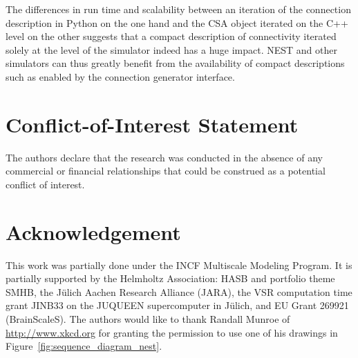 \documentclass{frontiersSCNS} %
\begin{document}
The differences in run time and scalability between an iteration of
the connection description in Python on the one hand and the CSA
object iterated on the C++ level on the other suggests that a compact
description of connectivity iterated solely at the level of the
simulator indeed has a huge impact. NEST and other simulators can thus
greatly benefit from the availability of compact descriptions such as
enabled by the connection generator interface.


\section*{Conflict-of-Interest Statement}
The authors declare that the research was conducted in the absence of
any commercial or financial relationships that could be construed as a
potential conflict of interest.

\section*{Acknowledgement}
This work was partially done under the INCF Multiscale Modeling
Program. It is partially supported by the Helmholtz Association: HASB
and portfolio theme SMHB, the Jülich Aachen Research Alliance (JARA),
the VSR computation time grant JINB33 on the JUQUEEN supercomputer in
Jülich, and EU Grant 269921 (BrainScaleS). The authors would like to
thank Randall Munroe of \url{http://www.xkcd.org} for granting the
permission to use one of his drawings in
Figure~\ref{fig:sequence_diagram_nest}.



\end{document}
